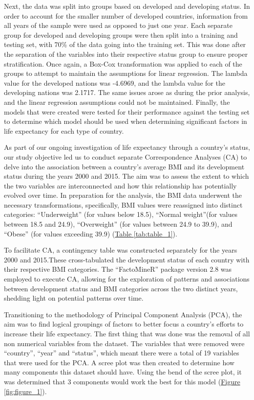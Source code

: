 \documentclass[12pt]{article}
\begin{document}
\begin{multicols}{2}
Next, the data was split into groups based on developed and developing status. In order to account for the smaller number of developed countries, information from all years of the sample were used as opposed to just one year. Each separate group for developed and developing groups were then split into a training and testing set, with 70\% of the data going into the training set. This was done after the separation of the variables into their respective status group to ensure proper stratification. Once again, a Box-Cox transformation was applied to each of the groups to attempt to maintain the assumptions for linear regression. The lambda value for the developed nations was -4.6969, and the lambda value for the developing nations was 2.1717. The same issues arose as during the prior analysis, and the linear regression assumptions could not be maintained. Finally, the models that were created were tested for their performance against the testing set to determine which model should be used when determining significant factors in life expectancy for each type of country. 

As part of our ongoing investigation of life expectancy through a country’s status, our study objective led us to conduct separate Correspondence Analyses (CA) to delve into the association between a country's average BMI and its development status during the years 2000 and 2015. The aim was to assess the extent to which the two variables are interconnected and how this relationship has potentially evolved over time. In preparation for the analysis, the BMI data underwent the necessary transformations, specifically, BMI values were reassigned into distinct categories: “Underweight” (for values below 18.5), “Normal weight”(for values between 18.5 and 24.9), “Overweight” (for values between 24.9 to 39.9), and “Obese” (for values exceeding 39.9) (\hyperref[tab:table_1]{Table \ref{tab:table_1}}).

To facilitate CA, a contingency table was constructed separately for the years 2000 and 2015.These cross-tabulated the development status of each country with their respective BMI categories. The “FactoMineR” package version 2.8 was employed to execute CA, allowing for the exploration of patterns and associations between development status and BMI categories across the two distinct years, shedding light on potential patterns over time. 

Transitioning to the methodology of Principal Component Analysis (PCA), the aim was to find logical groupings of factors to better focus a country’s efforts to increase their life expectancy. The first thing that was done was the removal of all non numerical variables from the dataset. The variables that were removed were “country”, “year” and “status”, which meant there were a total of 19 variables that were used for the PCA. A scree plot was then created to determine how many components this dataset should have. Using the bend of the scree plot, it was determined that 3 components would work the best for this model (\hyperref[fig:figure_1]{Figure \ref{fig:figure_1}}).


\end{multicols}
\end{document}
